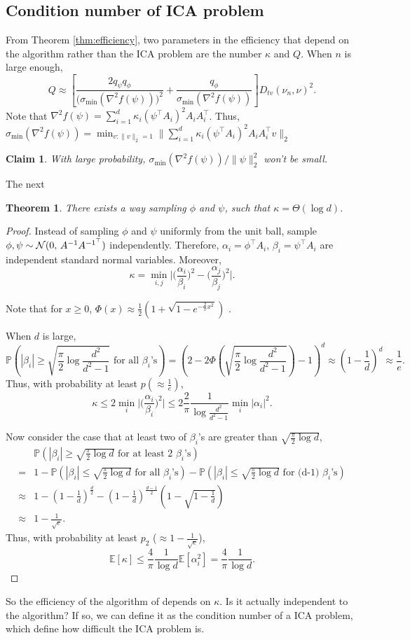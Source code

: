 \documentclass[english]{article} %
\newcommand{\cN}{\cal{N}}
\newcommand{\E}{\mathbb{E}}
\newcommand{\Prob}[1]{\mathbb{P}\left(#1\right)}
\newtheorem{thm}[lemma]{Theorem}
\newtheorem{claim}[lemma]{Claim}
\theoremstyle{definition}
\begin{document}
\subsection{Condition number of ICA problem}
From Theorem \ref{thm:efficiency}, two parameters in the efficiency that depend on the algorithm rather than the ICA problem are the number $\kappa$ and $Q$. 
When $n$ is large enough, 
\[
Q\approx \left[ \frac{2q_{\psi}q_{\phi}}{\big(\sigma_{\min}(\nabla^2f(\psi))\big)^2}+\frac{q_{\phi}}{\sigma_{\min}(\nabla^2f(\psi))}\right]D_{tv}(\nu_n , \nu)^2.
\] 
Note that $\nabla^2f(\psi) = \sum_{i=1}^{d} \kappa_i(\psi^{\top}A_i)^2A_iA_i^{\top}$. Thus, $\sigma_{\min}(\nabla^2f(\psi)) = \min_{v:\|v\|_2=1}\|\sum_{i=1}^{d} \kappa_i(\psi^{\top}A_i)^2A_iA_i^{\top}v\|_2$ 

\begin{claim}
With large probability, $\sigma_{\min}(\nabla^2f(\psi))/\|\psi\|_2^2$ won't be small.
\end{claim}

The next
\begin{thm}
There exists a way sampling $\phi$ and $\psi$, such that $\kappa = \Theta(\log d)$.
\end{thm}
\begin{proof}
Instead of sampling $\phi$ and $\psi$ uniformly from the unit ball, sample $\phi,\psi \sim {\cN} (0,\,A^{-1}A^{{-1}^{\top}})$ independently. Therefore, $\alpha_i = \phi^{\top}A_i$, $\beta_i = \psi^{\top}A_i$ are independent standard normal variables. Moreover, 
\[
\kappa  = \min_{i,j} \vert \big(\frac{\alpha_i}{\beta_i}\big)^2 - \big(\frac{\alpha_j}{\beta_j}\big)^2 \vert.
\] 

Note that for $x\ge0$, $\Phi(x) \approx \frac12 (1+\sqrt{1-e^{-\frac{2}{\pi}x^2}})$ \citep{aludaat2008note}.
 
 When $d$ is large,
\[
\Prob{|\beta_i| \ge \sqrt{\frac{\pi}{2}\log \frac{d^2}{d^2-1}} \text{ for all } \beta_i\text{'s}} = (2- 2\Phi(\sqrt{\frac{\pi}{2}\log \frac{d^2}{d^2-1}})-1)^d \approx \left(1-\frac{1}{d}\right)^d \approx \frac{1}{e}.
\]
Thus, with probability at least $p (\approx \frac{1}{e})$,
\[
\kappa \le 2 \min_i \vert \big(\frac{\alpha_i}{\beta_i}\big)^2\vert \le 2 \frac{2}{\pi}\frac{1}{\log \frac{d^2}{d^2-1}}\min_i |\alpha_i|^2.
\]

Now consider the case that at least two of $\beta_i$'s are greater than $\sqrt{\frac{\pi}{2}\log d}$,
\begin{align*}
& \Prob{|\beta_i| \ge \sqrt{\frac{\pi}{2}\log d} \text{ for at least 2 } \beta_i\text{'s}} \\
=  & 1 - \Prob{|\beta_i| \le \sqrt{\frac{\pi}{2}\log d} \text{ for all } \beta_i\text{'s}} - \Prob{|\beta_i| \le \sqrt{\frac{\pi}{2}\log d} \text{ for (d-1) } \beta_i\text{'s}} \\
\approx & 1 - (1-\frac{1}{d})^{\frac{d}{2}} -  (1-\frac{1}{d})^{\frac{d-1}{2}}(1-\sqrt{1-\frac{1}{d}}) \\
\approx & 1 -\frac{1}{\sqrt{e}}.
\end{align*}
Thus, with probability at least $p_2$ ($\approx 1-\frac{1}{\sqrt{e}}$),
\[
\E[\kappa] \le \frac{4}{\pi} \frac{1}{\log d} \E[\alpha_i^2] = \frac{4}{\pi} \frac{1}{\log d}.
\]
\end{proof}

So the efficiency of the algorithm of \citet{DHsu2012} depends on $\kappa$. Is it actually independent to the algorithm? If so, we can define it as the condition number of a ICA problem, which define how difficult the ICA problem is. 



\end{document}
